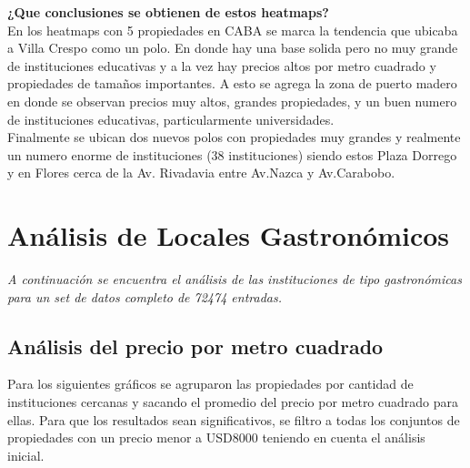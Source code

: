 \documentclass[a4paper, 10pt]{article}
\begin{document}
				
				\textbf{¿Que conclusiones se obtienen de estos heatmaps?}\\
				En los heatmaps con 5 propiedades en CABA se marca la tendencia que ubicaba a 
				Villa Crespo como un polo. En donde hay una base solida pero no muy grande de 
				instituciones educativas y a la vez hay precios altos por metro cuadrado y 
				propiedades de tamaños importantes. A esto se agrega la zona de puerto madero 
				en donde se observan precios muy altos, grandes propiedades, y un buen numero 
				de instituciones educativas, particularmente universidades.\\
				Finalmente se ubican dos nuevos polos con propiedades muy grandes y realmente un numero 
				enorme de instituciones (38 instituciones) siendo estos Plaza Dorrego y en Flores cerca 
				de la Av. Rivadavia entre Av.Nazca y Av.Carabobo.
		\section{Análisis de Locales Gastronómicos}
			\emph{A continuación se encuentra el análisis de las instituciones de tipo gastronómicas para 
			un set de datos completo de 72474 entradas.}
			\subsection{Análisis del precio por metro cuadrado}
				Para los siguientes gráficos se agruparon las propiedades por cantidad de instituciones 
				cercanas y sacando el promedio del precio por metro cuadrado para ellas. 
				Para que los resultados sean significativos, se filtro a todas los conjuntos 
				de propiedades con un precio menor a \textdollar USD8000 teniendo en cuenta 
				el análisis inicial.
				
\end{document}
